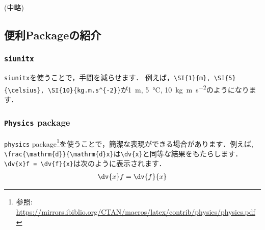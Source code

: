 (中略)

\subsection*{便利Packageの紹介}
\subsubsection{\texttt{siunitx}}
\texttt{siunitx}を使うことで，手間を減らせます．
例えば，\verb|\SI{1}{m}, \SI{5}{\celsius}, \SI{10}{kg.m.s^{-2}}|が\SI{1}{m}, \SI{5}{\celsius}, \SI{10}{kg.m.s^{-2}}のようになります．

\subsubsection{\texttt{Physics} package}
\texttt{physics} package\footnote{参照: \url{https://mirrors.ibiblio.org/CTAN/macros/latex/contrib/physics/physics.pdf}}を使うことで，簡潔な表現ができる場合があります．例えば,
\verb|\frac{\mathrm{d}}{\mathrm{d}x}|は\verb|\dv{x}|と同等な結果をもたらします．
\verb|\dv{x}f = \dv{f}{x}|は次のように表示されます．
\begin{align*}
  \dv{x}f = \dv{f}{x}
\end{align*}
